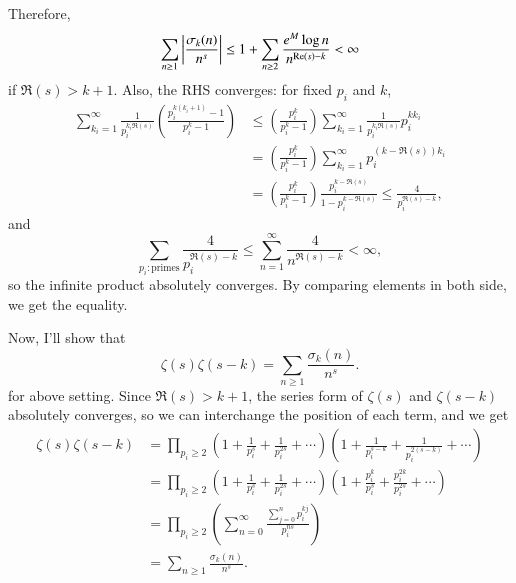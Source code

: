 \documentclass[a4paper, 12pt]{article}
\theoremstyle{Mydefinition}
\theoremstyle{Mytheorem}
\begin{document}
Therefore,
\begin{equation}
    \sum_{n\geq 1}\abs{\frac{\sigma_k(n)}{n^s}}\leq 1+ \sum_{n\geq 2}\frac{e^M \log n}{n^{\Re(s)-k}}<\infty
\end{equation}
if $\Re(s)>k+1$.
Also, the RHS converges: for fixed $p_i$ and $k$,
\begin{equation}
    \begin{split}
    \sum_{k_i=1}^\infty \frac{1}{p_i^{k_i\Re(s)}}\left(\frac{p_i^{k(k_i+1)}-1}{p_i^k-1}\right) &\leq \left(\frac{p_i^k}{p_i^k-1}\right)\sum_{k_i=1}^\infty \frac{1}{p_i^{k_i\Re(s)}}p_i^{kk_i}\\
    &=\left(\frac{p_i^k}{p_i^k-1}\right)\sum_{k_i=1}^\infty p_i^{(k-\Re(s))k_i}\\
    &=\left(\frac{p_i^k}{p_i^k-1}\right)\frac{p_i^{k-\Re(s)}}{1-p_i^{k-\Re(s)}}\leq  \frac{4}{p_i^{\Re(s)-k}},
    \end{split}
\end{equation}
and
\begin{equation}
    \sum_{p_i:\textrm{primes}}\frac{4}{p_i^{\Re(s)-k}}\leq \sum_{n=1}^\infty \frac{4}{n^{\Re(s)-k}}<\infty,
\end{equation}
so the infinite product absolutely converges. By comparing elements in both side, we get the equality.

Now, I'll show that
\begin{equation}
    \zeta(s)\zeta(s-k) = \sum_{n\geq 1}\frac{\sigma_k(n)}{n^s}.
\end{equation}
for above setting. Since $\Re(s)>k+1$, the series form of $\zeta(s)$ and $\zeta(s-k)$ absolutely converges, so we can interchange the position of each term, and we get
\begin{equation}
\begin{split}
    \zeta(s)\zeta(s-k) &= \prod_{p_i\geq 2}\left(1+\frac{1}{p_i^s}+\frac{1}{p_i^{2s}}+\cdots\right)\left(1+\frac{1}{p_i^{s-k}}+\frac{1}{p_i^{2(s-k)}}+\cdots\right)\\
    &=\prod_{p_i\geq 2}\left(1+\frac{1}{p_i^s}+\frac{1}{p_i^{2s}}+\cdots\right)\left(1+\frac{p_i^k}{p_i^{s}}+\frac{p_i^{2k}}{p_i^{2s}}+\cdots\right)\\
    &=\prod_{p_i\geq 2}\left(\sum_{n=0}^\infty \frac{\sum_{j=0}^n p_i^{kj}}{p_i^{ns}}\right)\\
    &=\sum_{n\geq 1}\frac{\sigma_k(n)}{n^s}.
\end{split}
\end{equation}
\end{document}
